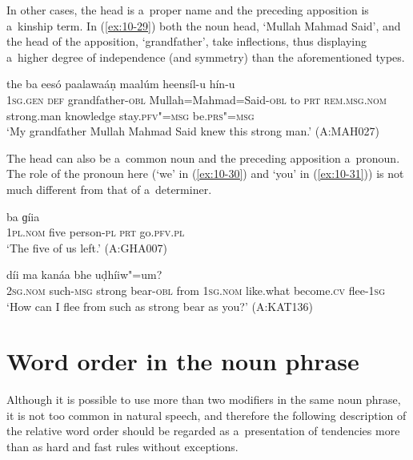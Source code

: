 In other cases, the head is a~proper name and the preceding apposition is a~kinship term. In (\ref{ex:10-29}) both the noun head, `Mullah Mahmad Said', and the head of the apposition, `grandfather', take inflections, thus displaying a~higher degree of independence (and symmetry) than the aforementioned types. 

\begin{exe}
\ex
\label{ex:10-29}
\gll [míi se dóod-a mulaa=mhaamad=seed-á] the ba eesó paalawaáṇ maalúm heensíl-u hín-u \\
\textsc{1sg.gen} \textsc{def} grandfather-\textsc{obl} Mullah=Mahmad=Said-\textsc{obl} to  \textsc{prt} \textsc{rem.msg.nom} strong.man knowledge  stay.\textsc{pfv"=msg} be.\textsc{prs"=msg}  \\
\glt `My grandfather Mullah Mahmad Said knew this strong man.' (A:MAH027)
\end{exe}


The head can also be a~common noun and the preceding apposition a~pronoun. The role of the pronoun here (`we' in (\ref{ex:10-30}) and `you' in (\ref{ex:10-31})) is not much different from that of a~determiner. 

\begin{exe}
\ex
\label{ex:10-30}
 ba ɡíia \\
\textsc{1pl.nom} five person-\textsc{pl} \textsc{prt} go.\textsc{pfv.pl}  \\
\glt `The five of us left.' (A:GHA007)

\ex
\label{ex:10-31}
 díi ma kanáa bhe uḍhíiw"=um? \\
\textsc{2sg.nom} such-\textsc{msg} strong bear-\textsc{obl} from \textsc{1sg.nom}  like.what become.\textsc{cv} flee-\textsc{1sg} \\
\glt `How can I flee from such as strong bear as you?' (A:KAT136)
\end{exe}

\section{Word order in the noun phrase}
\label{sec:10-2}


Although it is possible to use more than two modifiers in the same noun phrase, it is not too common in natural speech, and therefore the following description of the relative word order should be regarded as a~presentation of tendencies more than as hard and fast rules without exceptions. 


